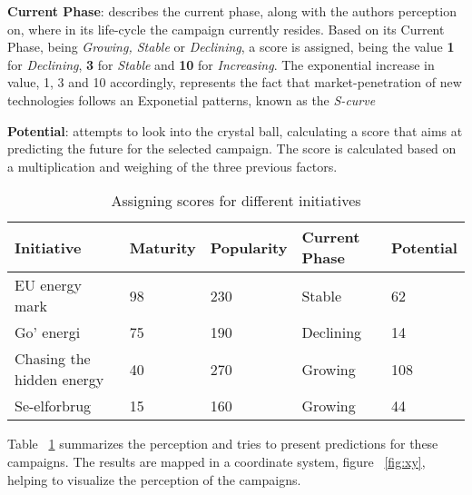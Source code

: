 \documentclass[journal]{IEEEtran}
\begin{document}
\textbf{Current Phase}: describes the current phase, along with the authors perception on, where in its life-cycle the campaign currently resides. Based on its Current Phase, being \textit{Growing, Stable} or \textit{Declining}, a score is assigned, being the value \textbf{1} for \textit{Declining}, \textbf{3} for \textit{Stable} and \textbf{10} for \textit{Increasing}. The exponential increase in value, 1, 3 and 10 accordingly, represents the fact that market-penetration of new technologies follows an Exponetial patterns, known as the \textit{S-curve}\cite{rogers_model} \newline

\textbf{Potential}: attempts to look into the crystal ball, calculating a score that aims at predicting the future for the selected campaign. The score is calculated based on a multiplication and weighing of the three previous factors. \newline 


\begin{table}[t2]

\caption{Assigning scores for different initiatives} %
\centering  %

\begin{tabular}{|p{2.5cm} |p{0.9cm} |p{0.9cm} |p{}| p{} |} %
\hline\hline                        %

Initiative & Maturity & Popularity & Current Phase & Potential\\ [0.5ex] %
\hline                  %

EU energy mark & 
98  & 
230 &
Stable &
62 \\
\hline

Go' energi & 
75 & 
190 &
Declining &
14 \\
\hline

Chasing the hidden energy & 
40 & 
270 &
Growing &
108 \\
\hline

Se-elforbrug & 
15  & 
160 &
Growing &
44 \\
\hline
\end{tabular}
\label{table:score} %
\end{table}

Table ~\ref{table:score} summarizes the perception and tries to present predictions for these campaigns. The results are mapped in a coordinate system, figure  ~\ref{fig:xy},  helping to visualize the perception of the campaigns.
\end{document}
